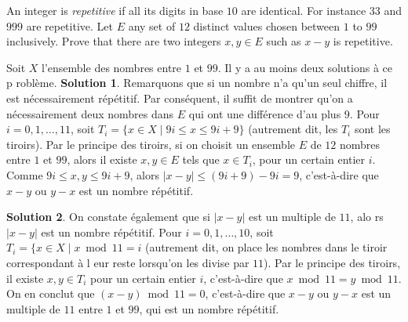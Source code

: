 \documentclass[12pt,addpoints]{exam}
\begin{document}
\begin{questions}
\question
An integer is \emph{repetitive} if all its digits in base $10$ are identical. For instance $33$ and $999$ are repetitive. Let $E$ any set of $12$ distinct values chosen between $1$ to $99$ inclusively. Prove that there are two integers $x,y \in E$ such as $x - y$ is repetitive.
\begin{solution}
Soit $X$ l'ensemble des nombres entre $1$ et $99$. Il y a au moins deux solutions à ce p
roblème.
\textbf{Solution 1}. Remarquons que si un nombre n'a qu'un seul chiffre, il est nécessairement répétitif. Par conséquent, il suffit de montrer qu'on a nécessairement deux nombres dans $E$ qui ont une différence d'au plus $9$. Pour $i = 0,1,\ldots,11$, soit $T_i = \{x \in X \mid 9i \leq x \leq 9i+9\}$ (autrement dit, les $T_i$ sont les tiroirs). Par le principe des tiroirs, si on choisit un ensemble $E$ de $12$ nombres entre $1$ et $99$, alors il existe $x, y \in E$ tels que $x \in T_i$, pour un certain entier $i$. Comme $9i \leq x,y \leq 9i + 9$, alors $|x - y| \leq (9i + 9) - 9i = 9$, c'est-à-dire que $x - y$ ou $y - x$ est un nombre répétitif.

\textbf{Solution 2}. On constate également que si $|x - y|$ est un multiple de $11$, alo rs $|x - y|$ est un nombre répétitif. Pour $i = 0,1,\ldots,10$, soit $T_i = \{x \in X \mid x \bmod 11 = i$ (autrement dit, on place les nombres dans le tiroir correspondant à l eur reste lorsqu'on les divise par $11$). Par le principe des tiroirs, il existe $x,y \in T_i$ pour un certain entier $i$, c'est-à-dire que $x \bmod 11 = y \bmod 11$. On en conclut que $(x - y) \bmod 11 = 0$, c'est-à-dire que $x - y$ ou $y - x$ est un multiple de $11$ entre $1$ et $99$, qui est un nombre répétitif.
\end{solution}



\end{questions}
\end{document}
